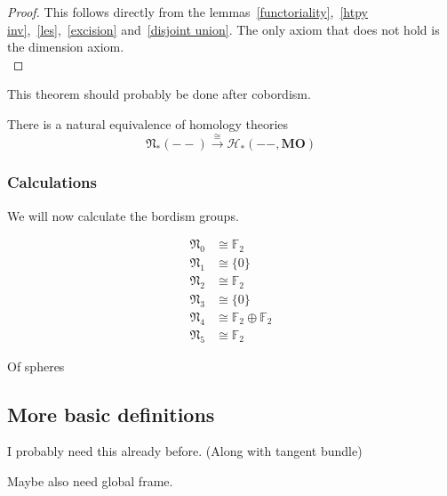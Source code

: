 \documentclass[a4paper,11pt]{article}
\begin{document}
\begin{proof}
    This follows directly from the lemmas\ \ref{functoriality},\ \ref{htpy inv},\ \ref{les},\ \ref{excision} and\ \ref{disjoint union}.
    The only axiom that does not hold is the dimension axiom.\\
\end{proof}


This theorem should probably be done after cobordism.
\begin{theorem}
    There is a natural equivalence of homology theories
    \[\mathfrak{N}_\ast(--)\xrightarrow{\cong}\mathcal{H}_\ast(--,\mathbf{MO})\]
\end{theorem}

\subsubsection{Calculations}

We will now calculate the bordism groups.

\begin{align*}
    \mathfrak N_0 &\cong \mathbb F_2\\
    \mathfrak N_1 &\cong \{0\}\\
    \mathfrak N_2 &\cong \mathbb F_2\\
    \mathfrak N_3 &\cong \{0\}\\
    \mathfrak N_4 &\cong \mathbb F_2\oplus\mathbb F_2\\
    \mathfrak N_5 &\cong \mathbb F_2
\end{align*}

Of spheres

\subsection{More basic definitions}

\begin{definition}
\end{definition}
I probably need this already before. (Along with tangent bundle)

\begin{definition}
\end{definition}

\begin{definition}
\end{definition}

\begin{definition}
\end{definition}
Maybe also need global frame.
\end{document}
